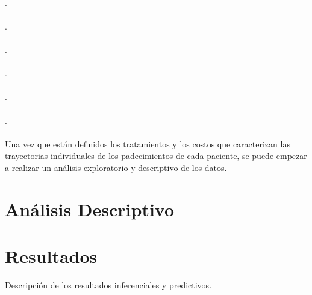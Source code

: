 \\
.\\
\\
.\\
\\
.\\
\\
.\\
\\
.\\
\\
.\\
\\
Una vez que est\'an definidos los tratamientos y los costos que caracterizan las trayectorias individuales de los padecimientos de cada paciente, se puede empezar a realizar un an\'alisis exploratorio y descriptivo de los datos.
\section{An\'alisis Descriptivo}

\section{Resultados}
Descripci\'on de los resultados inferenciales y predictivos.